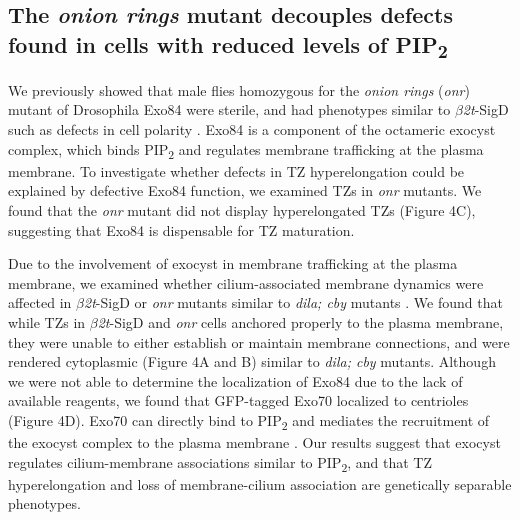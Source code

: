 \documentclass[12pt, twoside, letterpaper]{article}
\newcommand{\PIP}{PIP\textsubscript{2}}
\newcommand{\sigd}{$\beta$\textit{2t}-SigD}
\begin{document}
\begin{doublespacing}
\begin{linenumbers}
    \subsection{The \textit{onion rings} mutant decouples defects found in cells with reduced levels of \PIP{}}
    We previously showed that male flies homozygous for the \textit{onion rings}
    (\textit{onr}) mutant of Drosophila Exo84 were sterile, and had phenotypes
    similar to \sigd{} such as defects in cell polarity \citep{wei2008depletion}.
    Exo84 is a component of the octameric exocyst complex, which binds
    \PIP{} and regulates membrane trafficking at the plasma membrane.
    To investigate whether defects in TZ hyperelongation could be explained by
    defective Exo84 function, we examined TZs in \textit{onr} mutants.
    We found that the \textit{onr} mutant did not display hyperelongated TZs (Figure 4C),
    suggesting that Exo84 is dispensable for TZ maturation.

    Due to the involvement of exocyst in membrane trafficking at the plasma membrane,
    we examined whether cilium-associated membrane dynamics were affected in \sigd{}
    or \textit{onr} mutants similar to \textit{dila; cby} mutants
    \citep{vieillard2016transition}.
    We found that while TZs in \sigd{} and \textit{onr} cells anchored properly
    to the plasma membrane, they were unable to either establish or maintain
    membrane connections, and were rendered cytoplasmic (Figure 4A and B) similar to
    \textit{dila; cby} mutants.
    Although we were not able to determine the localization of Exo84 due to the
    lack of available reagents,
    we found that GFP-tagged Exo70 localized to centrioles (Figure 4D).
    Exo70 can directly bind to \PIP{} and mediates the recruitment of
    the exocyst complex to the plasma membrane \citep{he2007exo70}.
    Our results suggest that exocyst regulates
    cilium-membrane associations similar to \PIP{}, and that TZ hyperelongation and loss of
    membrane-cilium association are genetically separable phenotypes.


\end{linenumbers}
\end{doublespacing}
\end{document}
